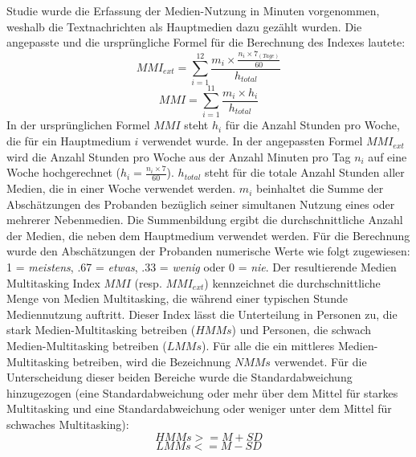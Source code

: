 Studie wurde die Erfassung der Medien-Nutzung in Minuten vorgenommen, weshalb die Textnachrichten als Hauptmedien dazu gezählt wurden. Die angepasste und die ursprüngliche Formel für die Berechnung des Indexes lautete:
\begin{equation}\label{formel.mmiext}
    MMI_{ext}=\sum_{i=1}^{12} \frac{m_{i} \times \frac{n_{i} \times 7_{(Tage)}}{60}}{h_{total}}
\end{equation}
\begin{equation}\label{formel.mmi}
    MMI=\sum_{i=1}^{11} \frac{m_{i} \times h_{i}}{h_{total}}
\end{equation}
In der ursprünglichen Formel $MMI$ steht \(h_{i}\) für die Anzahl Stunden pro Woche, die für ein Hauptmedium \(i\) verwendet wurde. In der angepassten Formel $MMI_{ext}$ wird die Anzahl Stunden pro Woche aus der Anzahl Minuten pro Tag \(n_i\) auf eine Woche hochgerechnet (\(h_{i}=\frac{n_{i} \times 7}{60}\)). \(h_{total}\) steht für die totale Anzahl Stunden aller Medien, die in einer Woche verwendet werden. \(m_i\) beinhaltet die Summe der Abschätzungen des Probanden bezüglich seiner simultanen Nutzung eines oder mehrerer Nebenmedien. Die Summenbildung ergibt die durchschnittliche Anzahl der Medien, die neben dem Hauptmedium verwendet werden. Für die Berechnung wurde den Abschätzungen der Probanden numerische Werte wie folgt zugewiesen: 1 = \textit{meistens}, .67 = \textit{etwas}, .33 = \textit{wenig} oder 0 = \textit{nie}. Der resultierende Medien Multitasking Index $MMI$ (resp. $MMI_{ext}$) kennzeichnet die durchschnittliche Menge von Medien Multitasking, die während einer typischen Stunde Mediennutzung auftritt. Dieser Index lässt die Unterteilung in Personen zu, die stark Medien-Multitasking betreiben ($HMMs$) und Personen, die schwach Medien-Multitasking betreiben ($LMMs$). Für alle die ein mittleres Medien-Multitasking betreiben, wird die Bezeichnung $NMMs$ verwendet. Für die Unterscheidung dieser beiden Bereiche wurde die Standardabweichung hinzugezogen (eine Standardabweichung oder mehr über dem Mittel für starkes Multitasking und eine Standardabweichung oder weniger unter dem Mittel für schwaches Multitasking): 
\begin{equation}\label{formel.hmms}
    HMMs>=M+SD
\end{equation}
\begin{equation}\label{formel.lmms}
    LMMs<=M-SD
\end{equation}

